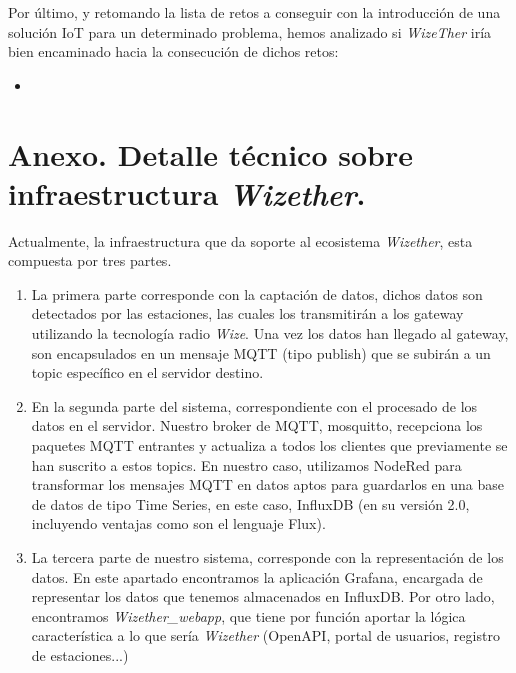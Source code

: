 \documentclass[12pt]{article}
\begin{document}

\noindent Por último, y retomando la lista de retos a conseguir con la introducción de una solución IoT para un determinado problema, hemos analizado si \textit{WizeTher} iría bien encaminado hacia la consecución de dichos retos: \\

\begin{itemize}
	\item 
\end{itemize}


\pagebreak

\section{Anexo. Detalle técnico sobre infraestructura \textit{Wizether}.}

\noindent Actualmente, la infraestructura que da soporte al ecosistema \textit{Wizether}, esta compuesta por tres partes. 

\begin{enumerate}
	\item La primera parte corresponde con la captación de datos, dichos datos son detectados por las estaciones, las cuales los transmitirán a los gateway utilizando la tecnología radio \textit{Wize}. Una vez los datos han llegado al gateway, son encapsulados en un mensaje MQTT (tipo publish) que se subirán a un topic específico en el servidor destino.
	
	\item En la segunda parte del sistema, correspondiente con el procesado de los datos en el servidor. Nuestro broker de MQTT, mosquitto, recepciona los paquetes MQTT entrantes y actualiza a todos los clientes que previamente se han suscrito a estos topics. En nuestro caso, utilizamos NodeRed para transformar los mensajes MQTT en datos aptos para guardarlos en una base de datos de tipo Time Series, en este caso, InfluxDB (en su versión 2.0, incluyendo ventajas como son el lenguaje Flux).
	
	\item La tercera parte de nuestro sistema, corresponde con la representación de los datos. En este apartado encontramos la aplicación Grafana, encargada de representar los datos que tenemos almacenados en InfluxDB. Por otro lado, encontramos \textit{Wizether\_webapp}, que tiene por función aportar la lógica característica a lo que sería \textit{Wizether} (OpenAPI, portal de usuarios, registro de estaciones...)
\end{enumerate}
\end{document}
